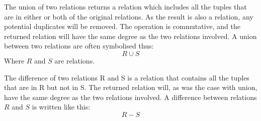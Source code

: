 The union of two relations returns a relation which includes all the tuples that are in either or both of the
original relations. As the result is also a relation, any potential duplicates will be removed. The operation is
commutative, and the returned relation will have the same degree as the two relations involved. A union between
two relations are often symbolised thus:
\begin{equation*}
R \cup S
\end{equation*}
Where $R$ and $S$ are relations.

The difference of two relations R and S is a relation that contains all the tuples that are in R but not in S. The
returned relation will, as was the case with union, have the same degree as the two relations involved. A
difference between relations $R$ and $S$ is written like this:
\begin{equation*}
R - S 
\end{equation*}

